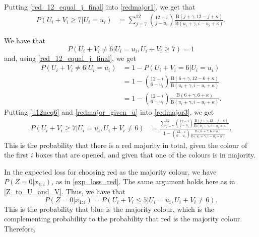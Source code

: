 Putting \eqref{red_12_equal_j_final} into \eqref{redmajor1}, we get that
\begin{equation}
\label{redmajor_given_u}
    \begin{aligned}
        P(U_i+V_i \geq 7 | U_i=u_i) 
        &= \sum_{j=7}^{12} \binom{12-i}{j-u_i} \frac{\text{B}(j+\gamma,12-j+\kappa)}{\text{B}(u_i+\gamma,i-u_i+\kappa)}.
    \end{aligned}
\end{equation}

We have that
\begin{equation*}
    P(U_i+V_i\neq6|U_i=u_i,U_i+V_i\geq7)=1
\end{equation*}
and, using \eqref{red_12_equal_j_final}, we get 
\begin{equation}
\label{u12neq6}
    \begin{aligned}
        P(U_i+V_i\neq6|U_i=u_i) 
        &= 1-P(U_i+V_i=6|U_i=u_i)\\[6pt]
        &= 1-\binom{12-i}{6-u_i} \frac{\text{B}(6+\gamma,12-6+\kappa)}{\text{B}(u_i+\gamma,i-u_i+\kappa)}\\[6pt]
        &= 1-\binom{12-i}{6-u_i} \frac{\text{B}(6+\gamma,6+\kappa)}{\text{B}(u_i+\gamma,i-u_i+\kappa)}.
    \end{aligned}
\end{equation}
Putting \eqref{u12neq6} and \eqref{redmajor_given_u} into \eqref{redmajor3}, we get
\begin{equation}
\label{redmajor_final}
    \begin{aligned}
        P(U_i+V_i \geq 7 | U_i=u_i,U_i+V_i \neq 6) 
        &= \frac{\sum_{j=7}^{12} \binom{12-i}{j-u_i} \frac{\text{B}(j+\gamma,12-j+\kappa)}{\text{B}(u_i+\gamma,i-u_i+\kappa)}}{1-\binom{12-i}{6-u_i} \frac{\text{B}(6+\gamma,6+\kappa)}{\text{B}(u_i+\gamma,i-u_i+\kappa)}}.
    \end{aligned}
\end{equation}
This is the probability that there is a red majority in total, given the colour of the first $i$ boxes that are opened, and given that one of the colours is in majority. 


In the expected loss for choosing red as the majority colour, we have $P(Z=0|x_{1:i})$, as in \eqref{exp_loss_red}. The same argument holds here as in \eqref{Z_to_U_and_V}. Thus, we have that
\begin{equation}
    P(Z=0|x_{1:i}) = P(U_i+V_i \leq 5 | U_i=u_i,U_i+V_i \neq 6).
\end{equation}
This is the probability that blue is the majority colour, which is the complementing probability to the probability that red is the majority colour. Therefore,

